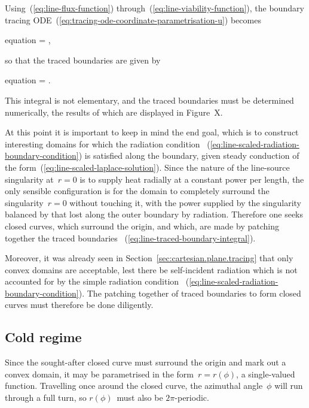 Using~(\ref{eq:line-flux-function})
through~(\ref{eq:line-viability-function}),
the boundary tracing ODE~(\ref{eq:tracing-ode-coordinate-parametrisation-u})
becomes
\begin{important}{equation}
   = \mp {},
  \label{eq:line-tracing-ode-coordinate-parametrisation-r}
\end{important}
so that the traced boundaries are given by
\begin{important}{equation}
  \phi = \mp \int {}.
  \label{eq:line-traced-boundary-integral}
\end{important}
This integral is not elementary,
and the traced boundaries must be determined numerically,
the results of which are displayed in Figure~X. %

At this point it is important to keep in mind the end goal,
which is to construct interesting domains
for which the radiation condition~%
  (\ref{eq:line-scaled-radiation-boundary-condition})
is satisfied along the boundary,
given steady conduction of the form~(\ref{eq:line-scaled-laplace-solution}).
Since the nature of the line-source singularity at~$r = 0$
is to supply heat radially at a constant power per length,
the only sensible configuration is for the domain to
completely surround the singularity~$r = 0$ without touching it,
with the power supplied by the singularity balanced
by that lost along the outer boundary by radiation.
Therefore one seeks closed curves,
which surround the origin,
and which, are made by patching together the traced boundaries~%
  (\ref{eq:line-traced-boundary-integral}).

Moreover, it was already seen in Section~\ref{sec:cartesian.plane.tracing}
that only convex domains are acceptable,
lest there be self-incident radiation which is not accounted for
by the simple radiation condition~%
  (\ref{eq:line-scaled-radiation-boundary-condition}).
The patching together of traced boundaries to form closed curves
must therefore be done diligently.

\subsection{Cold regime}
\label{sec:polar.tracing.cold}

Since the sought-after closed curve must surround the origin
and mark out a convex domain,
it may be parametrised in the form~$r = r (\phi)$,
a single-valued function.
Travelling once around the closed curve,
the azimuthal angle~$\phi$ will run through a full turn,
so $r (\phi)$~must also be $2 \pi$-periodic.

